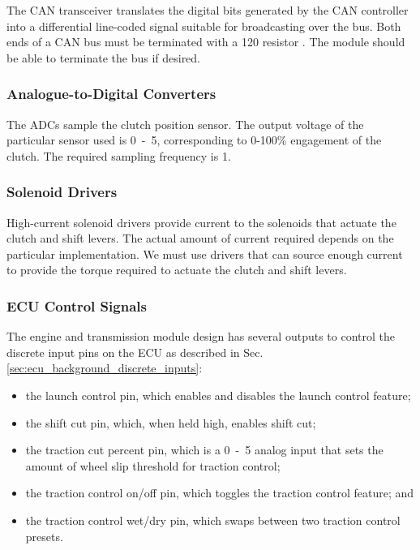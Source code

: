 The CAN transceiver translates the digital bits generated by the CAN controller into a differential line-coded signal suitable for broadcasting over the bus. Both ends of a CAN bus must be terminated with a \unit{120}{\ohm} resistor \cite{MCP2551}. The module should be able to terminate the bus if desired.

\subsubsection{Analogue-to-Digital Converters}

The ADCs sample the clutch position sensor. The output voltage of the particular sensor used is \unit{0-5}{\volt}, corresponding to 0-100\% engagement of the clutch. The required sampling frequency is \unit{1}{\kilo\hertz}.

\subsubsection{Solenoid Drivers}

High-current solenoid drivers provide current to the solenoids that actuate the clutch and shift levers. The actual amount of current required depends on the particular implementation. We must use drivers that can source enough current to provide the torque required to actuate the clutch and shift levers. 
 
\subsubsection{ECU Control Signals}

The engine and transmission module design has several outputs to control the discrete input pins on the ECU as described in Sec. \ref{sec:ecu_background_discrete_inputs}:

\begin{itemize}
  \item the launch control pin, which enables and disables the launch control feature;
  \item the shift cut pin, which, when held high, enables shift cut;
  \item the traction cut percent pin, which is a \unit{0-5}{\volt} analog input that sets the amount of wheel slip threshold for traction control;
  \item the traction control on/off pin, which toggles the traction control feature; and
  \item the traction control wet/dry pin, which swaps between two traction control presets.
\end{itemize}

